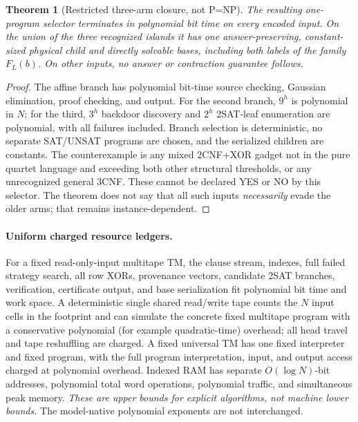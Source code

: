 \documentclass[11pt]{article}
\newtheorem{theorem}{Theorem}
\begin{document}
\begin{theorem}[Restricted three-arm closure, not P=NP]
The resulting \emph{one-program} selector terminates in polynomial bit time
on every encoded input.  On the union of the three recognized islands it
has one answer-preserving, constant-sized physical child and directly
solvable bases, including both labels of the family $F_L(b)$.
On other inputs, no answer or contraction guarantee follows.
\end{theorem}
\begin{proof}
The affine branch has polynomial bit-time source checking, Gaussian
elimination, proof checking, and output.  For the second branch, $9^h$ is
polynomial in $N$; for the third, $3^h$ backdoor discovery and $2^h$
2SAT-leaf enumeration are polynomial, with all failures included.
Branch selection is deterministic, no separate SAT/UNSAT programs are
chosen, and the serialized children are constants.  The counterexample is
any mixed 2CNF+XOR gadget not in the pure quartet language and exceeding
both other structural thresholds, or any unrecognized general 3CNF.
These cannot be declared YES or NO by this selector.  The theorem does
not say that all such inputs \emph{necessarily} evade the older arms;
that remains instance-dependent.
\end{proof}

\paragraph{Uniform charged resource ledgers.}
For a fixed read-only-input multitape TM, the clause stream, indexes,
full failed strategy search, all row XORs, provenance vectors, candidate
2SAT branches, verification, certificate output, and base serialization
fit polynomial bit time and work space.  A deterministic single shared
read/write tape counts the $N$ input cells in the footprint and can
simulate the concrete fixed multitape program with a conservative
polynomial (for example quadratic-time) overhead; all head travel and
tape reshuffling are charged.  A fixed universal TM has one fixed
interpreter and fixed program, with the full program interpretation,
input, and output access charged at polynomial overhead.  Indexed RAM
has separate $O(\log N)$-bit addresses, polynomial total word operations,
polynomial traffic, and simultaneous peak memory.  \emph{These are upper
bounds for explicit algorithms, not machine lower bounds.}  The
model-native polynomial exponents are not interchanged.
\end{document}
